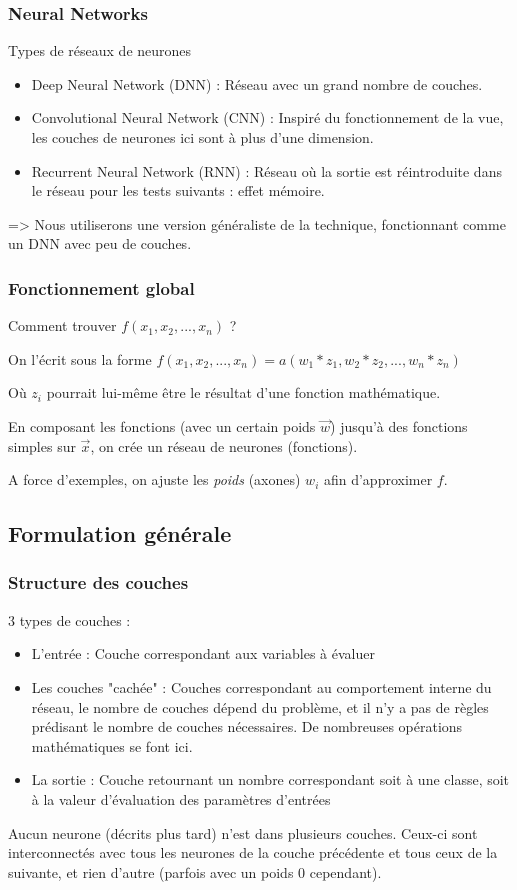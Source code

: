 \documentclass[compress]{beamer}
\begin{document}
			\begin{frame}
				\frametitle{Neural Networks}
				\begin{block}{Types de réseaux de neurones}
					\begin{itemize}
						\item Deep Neural Network (DNN) : Réseau avec un grand nombre de couches.
						\item Convolutional Neural Network (CNN) : Inspiré du fonctionnement de la vue, les couches de neurones ici sont à plus d'une dimension.
						\item Recurrent Neural Network (RNN) : Réseau où la sortie est réintroduite dans le réseau pour les tests suivants : effet mémoire. 
					\end{itemize}
				\end{block}
				
				=> Nous utiliserons une version généraliste de la technique, fonctionnant comme un DNN avec peu de couches.
			\end{frame}
	
			
			\begin{frame}
				\frametitle{Fonctionnement global}
					Comment trouver $f(x_1, x_2, ..., x_n)$ ?
				
					On l'écrit sous la forme $f(x_1, x_2, ..., x_n) = a(w_1 * z_1, w_2 * z_2, ..., w_n * z_n)$
					
					Où $z_i$ pourrait lui-même être le résultat d'une fonction mathématique.
					
					En composant les fonctions (avec un certain poids $\vec{w}$) jusqu'à des fonctions simples sur $\vec{x}$, on crée un réseau de neurones (fonctions).
				
					A force d'exemples, on ajuste les \emph{poids} (axones) $w_i$ afin d'approximer $f$.
			\end{frame}


		\subsection{Formulation générale}
			\begin{frame}
				\frametitle{Structure des couches}
				3 types de couches :
				\begin{itemize}
					\item L'entrée : Couche correspondant aux variables à évaluer
					\item Les couches "cachée" : Couches correspondant au comportement interne du réseau, le nombre de couches dépend du problème, et il n'y a pas de règles prédisant le nombre de couches nécessaires. De nombreuses opérations mathématiques se font ici.
					\item La sortie : Couche retournant un nombre correspondant soit à une classe, soit à la valeur d'évaluation des paramètres d'entrées
				\end{itemize}
				
				Aucun neurone (décrits plus tard) n'est dans plusieurs couches. Ceux-ci sont interconnectés avec tous les neurones de la couche précédente et tous ceux de la suivante, et rien d'autre (parfois avec un poids 0 cependant).
				
			\end{frame}
\end{document}
